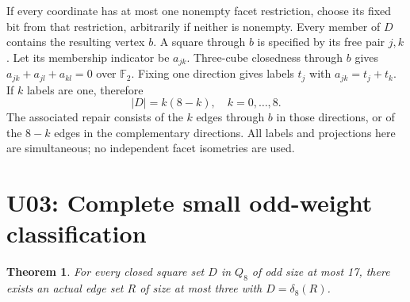 \documentclass{article}
\newtheorem{theorem}{Theorem}
\begin{document}
If every coordinate has at most one nonempty facet restriction, choose its
fixed bit from that restriction, arbitrarily if neither is nonempty. Every
member of $D$ contains the resulting vertex $b$. A square through $b$ is
specified by its free pair $j,k$. Let its membership indicator be $a_{jk}$.
Three-cube closedness through $b$ gives $a_{jk}+a_{jl}+a_{kl}=0$ over
$\mathbb F_2$. Fixing one direction gives labels $t_j$ with
$a_{jk}=t_j+t_k$. If $k$ labels are one, therefore
\[
 |D|=k(8-k),\quad k=0,\ldots,8.                            \tag{2}
\]
The associated repair consists of the $k$ edges through $b$ in those
directions, or of the $8-k$ edges in the complementary directions.
All labels and projections here are simultaneous; no independent facet
isometries are used.

\section{U03: Complete small odd-weight classification}
\begin{theorem}
For every closed square set $D$ in $Q_8$ of odd size at most 17, there
exists an actual edge set $R$ of size at most three with $D=\delta_8(R)$.
\end{theorem}
\end{document}
